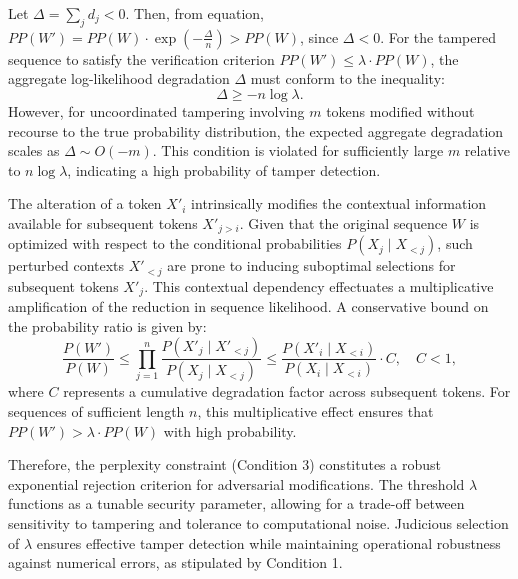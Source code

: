 \documentclass{article}
\begin{document}
Let \(\Delta = \sum_j d_j < 0\). Then, from equation, \(PP(W') = PP(W) \cdot \exp\left(-\frac{\Delta}{n}\right) > PP(W)\), since \(\Delta < 0\). For the tampered sequence to satisfy the verification criterion \(PP(W') \leq \lambda \cdot PP(W)\), the aggregate log-likelihood degradation \(\Delta\) must conform to the inequality:
\[
\Delta \geq -n \log \lambda.
\]
However, for uncoordinated tampering involving \(m\) tokens modified without recourse to the true probability distribution, the expected aggregate degradation scales as \(\Delta \sim O(-m)\). This condition is violated for sufficiently large \(m\) relative to \(n \log \lambda\), indicating a high probability of tamper detection.

The alteration of a token \(X'_i\) intrinsically modifies the contextual information available for subsequent tokens \(X'_{j>i}\). Given that the original sequence \(W\) is optimized with respect to the conditional probabilities \(P(X_{j} \mid X_{<j})\), such perturbed contexts \(X'_{<j}\) are prone to inducing suboptimal selections for subsequent tokens \(X'_j\). This contextual dependency effectuates a multiplicative amplification of the reduction in sequence likelihood. A conservative bound on the probability ratio is given by:
\[
\frac{P(W')}{P(W)} \leq \prod_{j=1}^n \frac{P(X'_j \mid X'_{<j})}{P(X_j \mid X_{<j})} \leq \frac{P(X'_i \mid X_{<i})}{P(X_i \mid X_{<i})} \cdot C, \quad C < 1,
\]
where \(C\) represents a cumulative degradation factor across subsequent tokens. For sequences of sufficient length \(n\), this multiplicative effect ensures that \(PP(W') > \lambda \cdot PP(W)\) with high probability.

Therefore, the perplexity constraint (Condition 3) constitutes a robust exponential rejection criterion for adversarial modifications. The threshold \( \lambda \) functions as a tunable security parameter, allowing for a trade-off between sensitivity to tampering and tolerance to computational noise. Judicious selection of \( \lambda \) ensures effective tamper detection while maintaining operational robustness against numerical errors, as stipulated by Condition 1.
\end{document}
